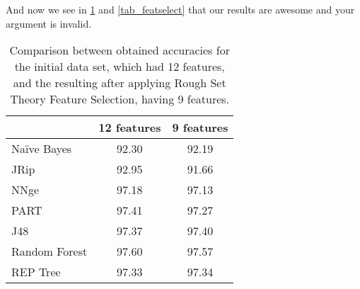 \documentclass{llncs}
\begin{document}
% 
% 
% 
% 

And now we see in \ref{tab_12featvs9feat} and \ref{tab_featselect} that our results are awesome and your argument is invalid.

\begin{table}[htpb]
\centering
 \caption{\label{tab_12featvs9feat} Comparison between obtained accuracies for the initial data set, which had 12 features, and the resulting after applying Rough Set Theory Feature Selection, having 9 features.}
{\small
\begin{tabular}{|l|c|c|}
\cline{2-3}
\multicolumn{1}{l|}{} & 12 features & 9 features \\ 
\hline
Naïve Bayes & 92.30 & 92.19 \\ 
\cline{1-1}
JRip & 92.95 & 91.66 \\ 
\cline{1-1}
NNge & 97.18 & 97.13 \\ 
\cline{1-1}
PART & 97.41 & 97.27 \\ 
\cline{1-1}
J48 & 97.37 & 97.40 \\ 
\cline{1-1}
Random Forest & 97.60 & 97.57 \\
\cline{1-1}
REP Tree & 97.33 & 97.34 \\ 
\hline
\end{tabular}
}
\end{table}
\end{document}
